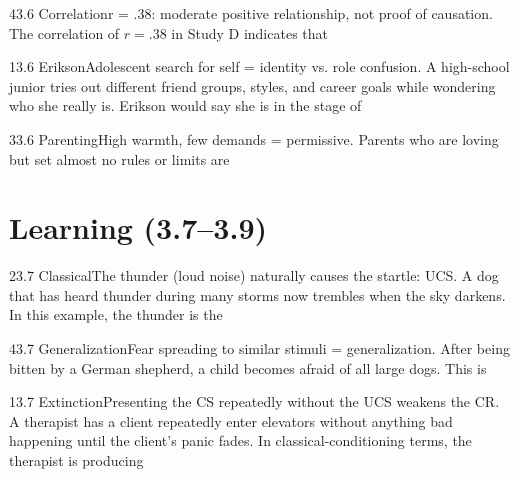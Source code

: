 \documentclass[11pt]{article}
\begin{document}
\begin{q}{4}{3.6 Correlation}{r = .38: moderate positive relationship, not proof of causation.}
The correlation of \(r = .38\) in Study D indicates that
\end{q}

\begin{q}{1}{3.6 Erikson}{Adolescent search for self = identity vs. role confusion.}
A high-school junior tries out different friend groups, styles, and career goals while wondering who she really is. Erikson would say she is in the stage of
\end{q}

\begin{q}{3}{3.6 Parenting}{High warmth, few demands = permissive.}
Parents who are loving but set almost no rules or limits are
\end{q}

\section{Learning (3.7--3.9)}

\begin{q}{2}{3.7 Classical}{The thunder (loud noise) naturally causes the startle: UCS.}
A dog that has heard thunder during many storms now trembles when the sky darkens. In this example, the thunder is the
\end{q}

\begin{q}{4}{3.7 Generalization}{Fear spreading to similar stimuli = generalization.}
After being bitten by a German shepherd, a child becomes afraid of all large dogs. This is
\end{q}

\begin{q}{1}{3.7 Extinction}{Presenting the CS repeatedly without the UCS weakens the CR.}
A therapist has a client repeatedly enter elevators without anything bad happening until the client's panic fades. In classical-conditioning terms, the therapist is producing
\end{q}
\end{document}
